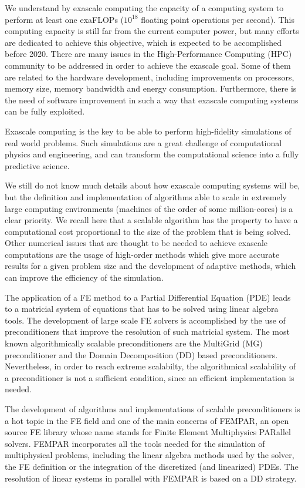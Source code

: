 We understand by exascale computing the capacity of a computing system to perform at least one exaFLOPs ($ 10^{18} $ floating point operations per second). This computing capacity is still far from the current computer power, but many efforts are dedicated to achieve this objective, which is expected to be accomplished before 2020. There are many issues in the High-Performance Computing (HPC) community to be addressed in order to achieve the exascale goal. Some of them are related to the hardware development, including improvements on processors, memory size, memory bandwidth and energy consumption. Furthermore, there is the need of software improvement in such a way that exascale computing systems can be fully exploited.

Exascale computing is the key to be able to perform high-fidelity simulations of real world problems. Such simulations are a great challenge of computational physics and engineering, and can transform the computational science into a fully predictive science.

We still do not know much details about how exascale computing systems will be, but the definition and implementation of algorithms able to scale in extremely large computing environments (machines of the order of some million-cores) is a clear priority. We recall here that a scalable algorithm has the property to have a computational cost proportional to the size of the problem that is being solved. Other numerical issues that are thought to be needed to achieve exascale computations are the usage of high-order methods which give more accurate results for a given problem size and the development of adaptive methods, which can improve the efficiency of the simulation.

The application of a FE method to a Partial Differential Equation (PDE) leads to a matricial system of equations that has to be solved using linear algebra tools. The development of large scale FE solvers is accomplished by the use of preconditioners that improve the resolution of such matricial system. The most known algorithmically scalable preconditioners are the MultiGrid (MG) preconditioner and the Domain Decomposition (DD) based preconditioners. Nevertheless, in order to reach extreme scalabilty, the algorithmical scalability of a preconditioner is not a sufficient condition, since an efficient implementation is needed. 

The development of algorithms and implementations of scalable preconditioners is a hot topic in the FE field and one of the main concerns of FEMPAR, an open source FE library whose name stands for Finite Element Multiphysics PARallel solvers. FEMPAR incorporates all the tools needed for the simulation of multiphysical problems, including the linear algebra methods used by the solver, the FE definition or the integration of the discretized (and linearized) PDEs. The resolution of linear systems in parallel with FEMPAR is based on a DD strategy.

